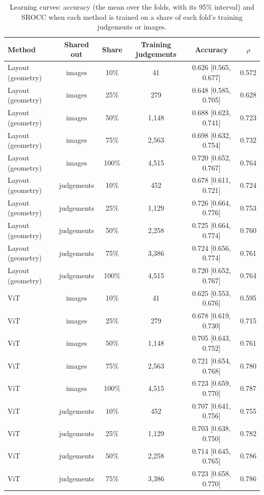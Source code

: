 \begin{table}[htbp]
  \centering
  \caption{Learning curves: accuracy (the mean over the folds, with its 95\% interval) and SROCC when each method is trained on a share of each fold's training judgements or images.}
  \label{tab:learning_curves}
  \begin{tabular}{lccccc}
    \toprule
    Method & Shared out & Share & Training judgements & Accuracy & $\rho$ \\
    \midrule
    Layout (geometry) & images & 10\% & 41 & 0.626 [0.565, 0.677] & 0.572 \\
    Layout (geometry) & images & 25\% & 279 & 0.648 [0.585, 0.705] & 0.628 \\
    Layout (geometry) & images & 50\% & 1,148 & 0.688 [0.623, 0.741] & 0.723 \\
    Layout (geometry) & images & 75\% & 2,563 & 0.698 [0.632, 0.754] & 0.732 \\
    Layout (geometry) & images & 100\% & 4,515 & 0.720 [0.652, 0.767] & 0.764 \\
    Layout (geometry) & judgements & 10\% & 452 & 0.678 [0.611, 0.721] & 0.724 \\
    Layout (geometry) & judgements & 25\% & 1,129 & 0.726 [0.664, 0.776] & 0.753 \\
    Layout (geometry) & judgements & 50\% & 2,258 & 0.725 [0.664, 0.774] & 0.760 \\
    Layout (geometry) & judgements & 75\% & 3,386 & 0.724 [0.656, 0.774] & 0.761 \\
    Layout (geometry) & judgements & 100\% & 4,515 & 0.720 [0.652, 0.767] & 0.764 \\
    ViT & images & 10\% & 41 & 0.625 [0.553, 0.676] & 0.595 \\
    ViT & images & 25\% & 279 & 0.678 [0.619, 0.730] & 0.715 \\
    ViT & images & 50\% & 1,148 & 0.705 [0.643, 0.752] & 0.761 \\
    ViT & images & 75\% & 2,563 & 0.721 [0.654, 0.768] & 0.780 \\
    ViT & images & 100\% & 4,515 & 0.723 [0.659, 0.770] & 0.787 \\
    ViT & judgements & 10\% & 452 & 0.707 [0.641, 0.756] & 0.755 \\
    ViT & judgements & 25\% & 1,129 & 0.703 [0.638, 0.750] & 0.782 \\
    ViT & judgements & 50\% & 2,258 & 0.714 [0.645, 0.765] & 0.786 \\
    ViT & judgements & 75\% & 3,386 & 0.723 [0.658, 0.770] & 0.786 \\

\end{tabular}
\end{table}
